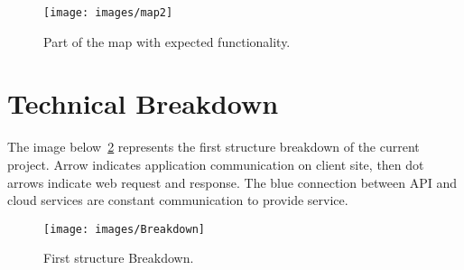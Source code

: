 \documentclass[12pt]{article}
\numberwithin{equation}{section} %
\numberwithin{figure}{section} %
\numberwithin{table}{section} %
\begin{document}
	\begin{figure}[H]
		\centering        
		\texttt{[image: images/map2]}
		\caption{Part of the map with expected functionality.}
		\label{fig:map2}
	\end{figure}
		
\newpage
\section{Technical Breakdown}	
	The image below~\ref{fig:break} represents the first structure breakdown of the current project. Arrow indicates application communication on client site, then dot arrows indicate web request and response. The blue connection between API and cloud services are constant communication to provide service.
	\begin{figure}[H]
		\centering		
		\texttt{[image: images/Breakdown]}
		\caption{First structure Breakdown.}
		\label{fig:break}
	\end{figure}	
	
\end{document}

